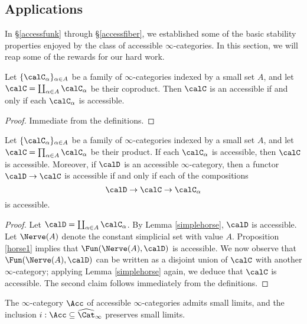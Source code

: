\subsection{Applications}\label{accessstable}

In \S \ref{accessfunk} through \S \ref{accessfiber}, we established some of the basic stability properties enjoyed by the class of accessible $\infty$-categories. In this section, we will reap some of the rewards for our hard work.

\begin{lemma}\label{simplehorse}
Let $\{ \calC_{\alpha} \}_{\alpha \in A}$ be a family of $\infty$-categories indexed by
a small set $A$, and let $\calC = \coprod_{ \alpha \in A} \calC_{\alpha}$ be their coproduct. Then
$\calC$ is an accessible if and only if each $\calC_{\alpha}$ is accessible.
\end{lemma}

\begin{proof}
Immediate from the definitions.
\end{proof}

\begin{lemma}\label{complexhorse}
Let $\{ \calC_{\alpha} \}_{ \alpha \in A}$ be a family of $\infty$-categories indexed by a small
set $A$, and let $\calC = \prod_{\alpha \in A} \calC_{\alpha}$ be their product. If each
$\calC_{\alpha}$ is accessible, then $\calC$ is accessible. Moreover, if $\calD$ is an accessible $\infty$-category, then a functor $\calD \rightarrow \calC$ is accessible if and only if each of the compositions
$$ \calD \rightarrow \calC \rightarrow \calC_{\alpha}$$
is accessible.
\end{lemma}

\begin{proof}
Let $\calD = \coprod_{\alpha \in A} \calC_{\alpha}$. By Lemma \ref{simplehorse}, $\calD$ is accessible. Let $\Nerve(A)$ denote the constant simplicial set with value $A$.
Proposition \ref{horse1} implies that $\Fun(\Nerve(A), \calD)$ is accessible. We now observe that
$\Fun(\Nerve(A), \calD)$ can be written as a disjoint union of $\calC$ with another $\infty$-category; applying Lemma \ref{simplehorse} again, we deduce that $\calC$ is accessible. The second claim follows immediately from the definitions.
\end{proof}

\begin{proposition}\label{accprop}
The $\infty$-category $\Acc$ of accessible $\infty$-categories admits small limits, and the inclusion $i: \Acc \subseteq \widehat{ \Cat}_{\infty}$ preserves small limits.
\end{proposition}

